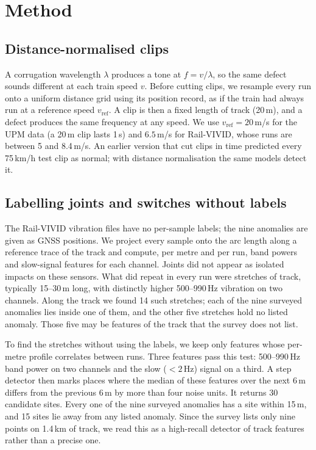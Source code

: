 \documentclass[conference]{IEEEtran}
\begin{document}
\section{Method}

\subsection{Distance-normalised clips}
A corrugation wavelength $\lambda$ produces a tone at $f = v/\lambda$, so the same defect sounds
different at each train speed $v$. Before cutting clips, we resample every run onto a uniform
distance grid using its position record, as if the train had always run at a reference speed
$v_\mathrm{ref}$. A clip is then a fixed length of track (20\,m), and a defect produces the same
frequency at any speed. We use $v_\mathrm{ref}=20$\,m/s for the UPM data (a 20\,m clip lasts 1\,s)
and $6.5$\,m/s for Rail-VIVID, whose runs are between 5 and 8.4\,m/s. An earlier version that cut
clips in time predicted every 75\,km/h test clip as normal; with distance normalisation the same
models detect it.

\subsection{Labelling joints and switches without labels}
\label{sec:vivid}
The Rail-VIVID vibration files have no per-sample labels; the nine anomalies are given as GNSS
positions. We project every sample onto the arc length along a reference trace of the track and
compute, per metre and per run, band powers and slow-signal features for each channel. Joints
did not appear as isolated impacts on these sensors. What did repeat in every run were stretches
of track, typically 15--30\,m long, with distinctly higher 500--990\,Hz vibration on two channels.
Along the track we found 14 such stretches; each of the nine surveyed anomalies lies inside one
of them, and the other five stretches hold no listed anomaly. Those five may be features of the
track that the survey does not list.

To find the stretches without using the labels, we keep only features whose per-metre profile
correlates between runs. Three features pass this test: 500--990\,Hz band power on two channels and
the slow ($<2$\,Hz) signal on a third. A step detector then marks places where the median of these
features over the next 6\,m differs from the previous 6\,m by more than four noise units. It
returns 30 candidate sites. Every one of the nine surveyed anomalies has a site within 15\,m, and
15 sites lie away from any listed anomaly. Since the survey lists only nine points on 1.4\,km of
track, we read this as a high-recall detector of track features rather than a precise one.
\end{document}
